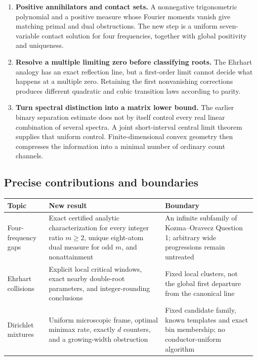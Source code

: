 \begin{enumerate}
\item \textbf{Positive annihilators and contact sets.}
A nonnegative trigonometric polynomial and a positive measure whose
Fourier moments vanish give matching primal and dual obstructions.
The new step is a uniform seven-variable contact solution for four
frequencies, together with global positivity and uniqueness.
\item \textbf{Resolve a multiple limiting zero before classifying roots.}
The Ehrhart analogy has an exact reflection line, but a first-order
limit cannot decide what happens at a multiple zero. Retaining the first
nonvanishing corrections produces different quadratic and cubic
transition laws according to parity.
\item \textbf{Turn spectral distinction into a matrix lower bound.}
The earlier binary separation estimate does not by itself control every
real linear combination of several spectra. A joint short-interval
central limit theorem supplies that uniform control. Finite-dimensional
convex geometry then compresses the information into a minimal number
of ordinary count channels.
\end{enumerate}

\subsection{Precise contributions and boundaries}
\begin{center}
\small
\begin{tabular}{@{}>{\raggedright\arraybackslash}p{}>{\raggedright\arraybackslash}p{}>{\raggedright\arraybackslash}p{}@{}}
\toprule
Topic & New result & Boundary \\
\midrule
Four-frequency gaps &
Exact certified analytic characterization for every integer ratio
$m\ge2$, unique eight-atom dual measure for odd $m$, and nonattainment &
An infinite subfamily of Kozma--Oravecz Question 1; arbitrary wide
progressions remain untreated \\
\addlinespace
Ehrhart collisions &
Explicit local critical windows, exact nearby double-root parameters,
and integer-rounding conclusions &
Fixed local clusters, not the global first departure from the
canonical line \\
\addlinespace
Dirichlet mixtures &
Uniform microscopic frame, optimal minimax rate, exactly $d$
counters, and a growing-width obstruction &
Fixed candidate family, known templates and exact bin membership;
no conductor-uniform algorithm \\
\bottomrule
\end{tabular}
\end{center}

